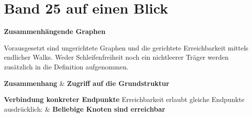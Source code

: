 \chapter[Band 25: Zusammenhängende Graphen]{Band 25 auf einen Blick}
\noindent\textbf{Zusammenhängende Graphen}\par\medskip
Vorausgesetzt sind ungerichtete Graphen und die gerichtete Erreichbarkeit
mittels endlicher Walks. Weder Schleifenfreiheit noch ein nichtleerer Träger
werden zusätzlich in die Definition aufgenommen.

\begin{BandUebersicht}
\textbf{Zusammenhang}
&
\textbf{Zugriff auf die Grundstruktur}
 \\
\addlinespace[.8ex]

\textbf{Verbindung konkreter Endpunkte}
Erreichbarkeit erlaubt gleiche Endpunkte ausdrücklich:
&
\textbf{Beliebige Knoten sind erreichbar}
 \\
\addlinespace[.8ex]
\end{BandUebersicht}

